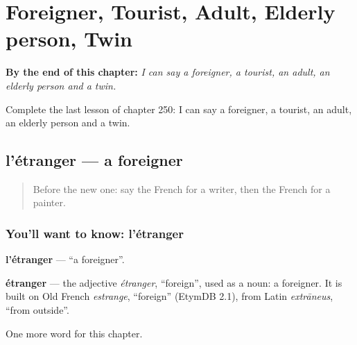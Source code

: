 
\chapter{Foreigner, Tourist, Adult, Elderly person, Twin}
\label{ch:fr-foreigner-tourist-adult-elderly-person-twin}

\begin{chapteropening}
\textbf{By the end of this chapter:} \emph{I can say a foreigner, a tourist, an adult, an elderly person and a twin.}

Complete the last lesson of chapter 250: I can say a foreigner, a tourist, an adult, an elderly person and a twin.
\end{chapteropening}

\section[l'étranger]{l'étranger — a foreigner}

\label{lesson:FR-C250-etranger}



\begin{quote}
Before the new one: say the French for a writer, then the French for a painter.
\end{quote}

\subsection*{You'll want to know: l'étranger}
\textbf{l'étranger} — \textquotedblleft{}a foreigner\textquotedblright{}.

\begin{cousinweb}
\textbf{étranger} — the adjective \emph{étranger}, \textquotedblleft{}foreign\textquotedblright{}, used as a noun: a foreigner. It is built on Old French \emph{estrange}, \textquotedblleft{}foreign\textquotedblright{} (EtymDB 2.1), from Latin \emph{extrāneus}, \textquotedblleft{}from outside\textquotedblright{}.
\end{cousinweb}

\begin{grammarlens}[title={What you've built}]
One more word for this chapter.
\end{grammarlens}


